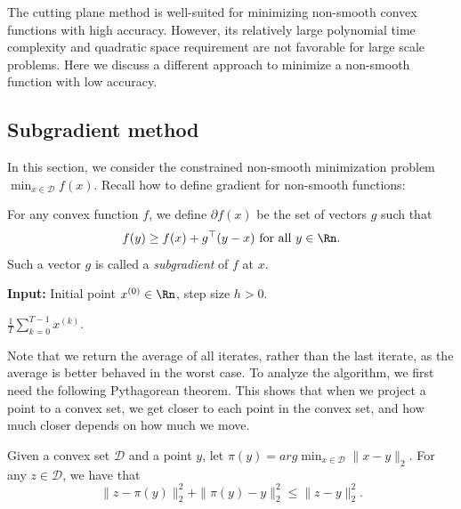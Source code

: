 The cutting plane method is well-suited for minimizing non-smooth
convex functions with high accuracy. However, its relatively large
polynomial time complexity and quadratic space requirement are not
favorable for large scale problems. Here we discuss a different approach
to minimize a non-smooth function with low accuracy.

\subsection{Subgradient method}

In this section, we consider the constrained non-smooth minimization
problem $\min_{x\in\mathcal{D}}f(x)$. Recall how to define gradient
for non-smooth functions:
\begin{defn}
For any convex function $f$, we define $\partial f(x)$ be the set
of vectors $g$ such that
\[
f(y)\geq f(x)+g^{\top}(y-x)\text{ for all }y\in\Rn.
\]
Such a vector $g$ is called a \emph{subgradient} of $f$ at $x$.
\end{defn}

\begin{algorithm2e}[H]

\caption{$\mathtt{SubgradientMethod}$}

\SetAlgoLined

\textbf{Input:} Initial point $x^{(0)}\in\Rn$, step size $h>0$.


\Return $\frac{1}{T}\sum_{k=0}^{T-1}x^{(k)}$.

\end{algorithm2e}

Note that we return the average of all iterates, rather than the last
iterate, as the average is better behaved in the worst case. To analyze
the algorithm, we first need the following Pythagorean theorem. This
shows that when we project a point to a convex set, we get closer
to each point in the convex set, and how much closer depends on how
much we move.
\begin{lem}
\label{lem:Pythagorean}Given a convex set $\mathcal{D}$ and a point
$y$, let $\pi(y)=arg\min_{x\in\mathcal{D}}\|x-y\|_{2}$. For any
$z\in\mathcal{D}$, we have that
\[
\|z-\pi(y)\|_{2}^{2}+\|\pi(y)-y\|_{2}^{2}\leq\|z-y\|_{2}^{2}.
\]
\end{lem}

